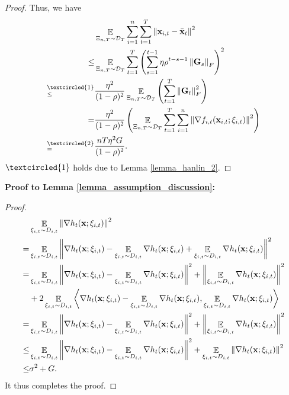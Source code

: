 \documentclass{article}
\begin{document}
\begin{proof}
Thus, we  have
\begin{align}
\nonumber
& \EE_{ \Xi_{n,T} \sim \Dcal_{T} } \sum_{i=1}^n\sum_{t=1}^T \lrnorm{\x_{i,t} - \bar{\x}_t}^2  \\ \nonumber 
\le & \EE_{ \Xi_{n,T} \sim \Dcal_{T} } \sum_{t=1}^T \lrincir{ \sum_{s=1}^{t-1} \eta \rho^{t-s-1} \lrnorm{\G_s}_F}^2  \\ \nonumber
\refabovecir{\le}{\textcircled{1}} & \frac{\eta^2}{(1-\rho)^2} \EE_{ \Xi_{n,T} \sim \Dcal_{T} } \lrincir{  \sum_{t=1}^T \lrnorm{\G_t}_F^2 } \\ \nonumber
= & \frac{\eta^2}{(1-\rho)^2} \lrincir{ \EE_{ \Xi_{n,T} \sim \Dcal_{T} } \sum_{t=1}^T \sum_{i=1}^n  \lrnorm{\nabla f_{i,t}(\x_{i,t};\xi_{i,t})}^2 } \\ \nonumber
\refabovecir{=}{\textcircled{2}} & \frac{nT\eta^2 G }{(1-\rho)^2}.
\end{align} $\textcircled{1}$ holds due to Lemma \ref{lemma_hanlin_2}. 
\end{proof}



\textbf{ Proof to Lemma \ref{lemma_assumption_discussion}:}
\begin{proof}
\begin{align}
\nonumber
&\mathop{\mathbb{E}}_{ \xi_{i,t} \sim D_{i,t} }\left\lVert\nabla h_t({\bf x};\xi_{i,t})\right\rVert^2 \\ \nonumber 
= & \mathop{\mathbb{E}}_{ \xi_{i,t} \sim D_{i,t} }\left\lVert\nabla h_t({\bf x};\xi_{i,t}) - \mathop{\mathbb{E}}_{ \xi_{i,t} \sim D_{i,t} }\nabla h_t({\bf x};\xi_{i,t}) + \mathop{\mathbb{E}}_{ \xi_{i,t} \sim D_{i,t} }\nabla h_t({\bf x};\xi_{i,t})\right\rVert^2 \\ \nonumber
= & \mathop{\mathbb{E}}_{ \xi_{i,t} \sim D_{i,t} }\left\lVert\nabla h_t({\bf x};\xi_{i,t}) - \mathop{\mathbb{E}}_{ \xi_{i,t} \sim D_{i,t} }\nabla h_t({\bf x};\xi_{i,t})\right\rVert^2 + \left\lVert\mathop{\mathbb{E}}_{ \xi_{i,t} \sim D_{i,t} }\nabla h_t({\bf x};\xi_{i,t})\right\rVert^2 \\ \nonumber
& + 2\mathop{\mathbb{E}}_{ \xi_{i,t} \sim D_{i,t} }\left\langle\nabla h_t({\bf x};\xi_{i,t}) - \mathop{\mathbb{E}}_{ \xi_{i,t} \sim D_{i,t} }\nabla h_t({\bf x};\xi_{i,t}),\mathop{\mathbb{E}}_{ \xi_{i,t} \sim D_{i,t} }\nabla h_t({\bf x};\xi_{i,t}) \right\rangle \\ \nonumber
= & \mathop{\mathbb{E}}_{ \xi_{i,t} \sim D_{i,t} }\left\lVert\nabla h_t({\bf x};\xi_{i,t}) - \mathop{\mathbb{E}}_{ \xi_{i,t} \sim D_{i,t} }\nabla h_t({\bf x};\xi_{i,t})\right\rVert^2 + \left\lVert\mathop{\mathbb{E}}_{ \xi_{i,t} \sim D_{i,t} }\nabla h_t({\bf x};\xi_{i,t})\right\rVert^2  \\ \nonumber
\le & \mathop{\mathbb{E}}_{ \xi_{i,t} \sim D_{i,t} }\left\lVert\nabla h_t({\bf x};\xi_{i,t}) - \mathop{\mathbb{E}}_{ \xi_{i,t} \sim D_{i,t} }\nabla h_t({\bf x};\xi_{i,t})\right\rVert^2 + \mathop{\mathbb{E}}_{ \xi_{i,t} \sim D_{i,t} }\left\lVert\nabla h_t({\bf x};\xi_{i,t})\right\rVert^2  \\ \nonumber
\le & \sigma^2 + G.
\end{align} It thus completes the proof.




\end{proof}
\end{document}
